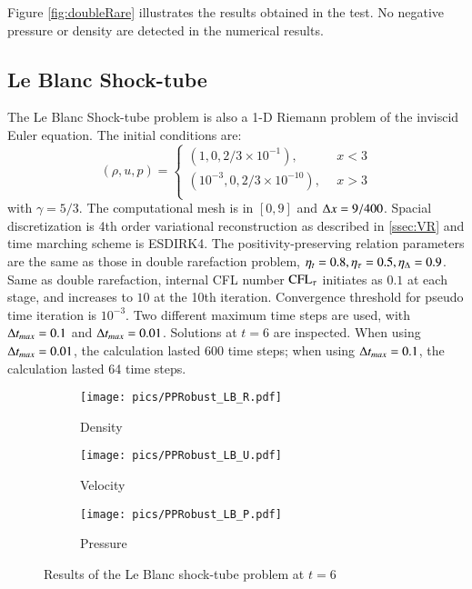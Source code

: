 \documentclass[preprint,12pt]{elsarticle}
\begin{document}
Figure \ref{fig:doubleRare} illustrates the results obtained in the 
test. No negative pressure or density are detected in the numerical
results.

\subsection{Le Blanc Shock-tube}

The Le Blanc Shock-tube problem \cite{hu2013positivity} is also a 1-D 
Riemann problem of the inviscid Euler equation. 
The initial conditions are:
\begin{equation}
    (\rho,u,p) = \left\{
        \begin{array}{ll}
            (1,0,2/3\times10^{-1}),\ \ & x < 3\\
            (10^{-3},0,2/3\times10^{-10}),\ \ & x > 3\\
        \end{array}
    \right.
\end{equation}
with $\gamma = 5/3$.
The computational mesh is in $[0,9]$ and $\mathrm\Delta x =9/400$.
Spacial discretization is 4th order variational reconstruction
as described in \ref{ssec:VR} and time marching scheme is ESDIRK4. 
The positivity-preserving relation parameters are the same as 
those in double rarefaction problem, $\eta_t= 0.8, \eta_\tau=0.5, \eta_\mathrm\Delta=0.9$.
Same as double rarefaction, 
internal CFL number $\text{CFL}_\tau$ initiates as $0.1$ at each stage, and 
increases to $10$ at the 10th iteration. 
Convergence threshold for pseudo time iteration is $10^{-3}$. 
Two different maximum time steps are used, with $\mathrm\Delta t_{max} = 0.1$ and $\mathrm\Delta t_{max} = 0.01$.
Solutions at $t=6$ are inspected.
When using $\mathrm\Delta t_{max} = 0.01$, the calculation lasted 600 time steps;
when using $\mathrm\Delta t_{max} = 0.1$, the calculation lasted 64 time steps.

\begin{figure}[htbp]
    \centering
    \begin{subfigure}{0.33\textwidth}
        \texttt{[image: pics/PPRobust\_LB\_R.pdf]}
        \caption[]{Density}
    \end{subfigure}\hfill
    \begin{subfigure}{0.33\textwidth}
        \texttt{[image: pics/PPRobust\_LB\_U.pdf]}
        \caption[]{Velocity}
    \end{subfigure}\hfill
    \begin{subfigure}{0.33\textwidth}
        \texttt{[image: pics/PPRobust\_LB\_P.pdf]}
        \caption[]{Pressure}
    \end{subfigure}
    \caption{Results of the Le Blanc shock-tube problem at $t=6$}
    \label{fig:leBlanc}
\end{figure}
\end{document}
